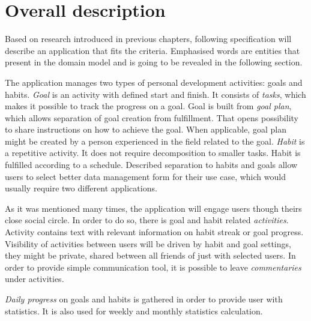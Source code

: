 
\section{Overall description}\label{sec:overall-description}

Based on research introduced in previous chapters, following specification will describe an application that fits the criteria.
Emphasised words are entities that present in the domain model and is going to be revealed in the following section.

The application manages two types of personal development activities: goals and habits.
\textit{Goal} is an activity with defined start and finish.
It consists of \textit{tasks}, which makes it possible to track the progress on a goal.
Goal is built from \textit{goal plan}, which allows separation of goal creation from fulfillment.
That opens possibility to share instructions on how to achieve the goal.
When applicable, goal plan might be created by a person experienced in the field related to the goal.
\textit{Habit} is a repetitive activity.
It does not require decomposition to smaller tasks.
Habit is fulfilled according to a schedule.
Described separation to habits and goals allow users to select better data management form for their use case, which would usually require two different applications.

As it was mentioned many times, the application will engage users though theirs close social circle.
In order to do so, there is goal and habit related \textit{activities}.
Activity contains text with relevant information on habit streak or goal progress.
Visibility of activities between users will be driven by habit and goal settings, they might be private, shared between all friends of just with selected users.
In order to provide simple communication tool, it is possible to leave \textit{commentaries} under activities.

\textit{Daily progress} on goals and habits is gathered in order to provide user with statistics.
It is also used for weekly and monthly statistics calculation.